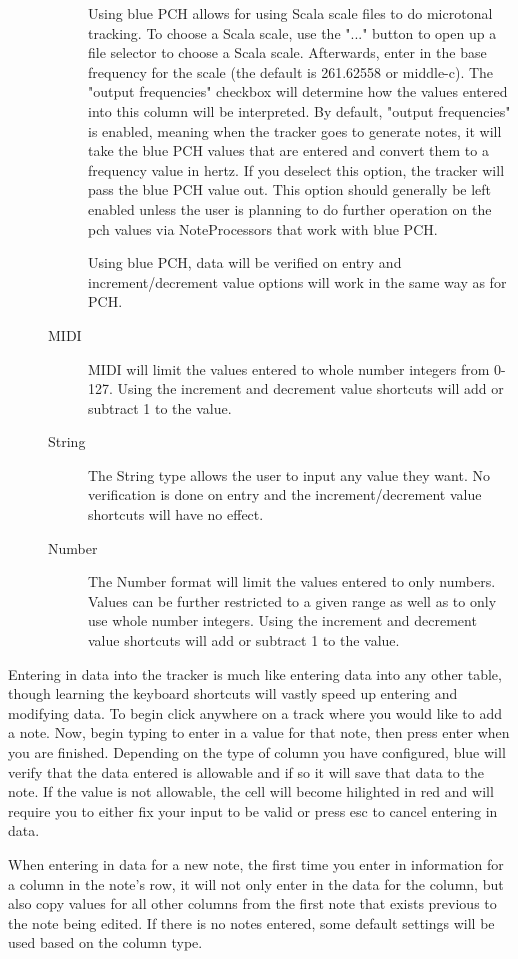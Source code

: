 \begin{description}
\begin{description}
Using blue PCH allows for using Scala scale files to do microtonal
tracking. To choose a Scala scale, use the "..." button to open up a
file selector to choose a Scala scale. Afterwards, enter in the base
frequency for the scale (the default is 261.62558 or middle-c). The
"output frequencies" checkbox will determine how the values entered into
this column will be interpreted. By default, "output frequencies" is
enabled, meaning when the tracker goes to generate notes, it will take
the blue PCH values that are entered and convert them to a frequency
value in hertz. If you deselect this option, the tracker will pass the
blue PCH value out. This option should generally be left enabled unless
the user is planning to do further operation on the pch values via
NoteProcessors that work with blue PCH.

Using blue PCH, data will be verified on entry and increment/decrement
value options will work in the same way as for PCH.
\item[MIDI]
MIDI will limit the values entered to whole number integers from 0-127.
Using the increment and decrement value shortcuts will add or subtract 1
to the value.
\item[String]
The String type allows the user to input any value they want. No
verification is done on entry and the increment/decrement value
shortcuts will have no effect.
\item[Number]
The Number format will limit the values entered to only numbers. Values
can be further restricted to a given range as well as to only use whole
number integers. Using the increment and decrement value shortcuts will
add or subtract 1 to the value.
\end{description}
\end{description}

Entering in data into the tracker is much like entering data into any
other table, though learning the keyboard shortcuts will vastly speed up
entering and modifying data. To begin click anywhere on a track where
you would like to add a note. Now, begin typing to enter in a value for
that note, then press enter when you are finished. Depending on the type
of column you have configured, blue will verify that the data entered is
allowable and if so it will save that data to the note. If the value is
not allowable, the cell will become hilighted in red and will require
you to either fix your input to be valid or press esc to cancel entering
in data.

When entering in data for a new note, the first time you enter in
information for a column in the note's row, it will not only enter in
the data for the column, but also copy values for all other columns from
the first note that exists previous to the note being edited. If there
is no notes entered, some default settings will be used based on the
column type.

